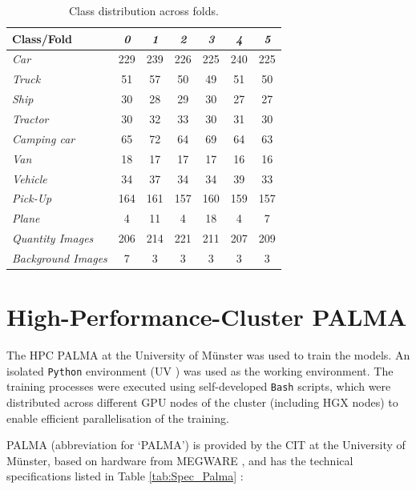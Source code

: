 \begin{table}[h!]
\centering
\begin{tabular}{lcccccc}
\textbf{Class/Fold} & \textit{0} & \textit{1} & \textit{2} & \textit{3} & \textit{4} & \textit{5} \\
\hline
\textit{Car}              & 229 & 239 & 226 & 225 & 240 & 225 \\
\textit{Truck}            & 51  & 57  & 50  & 49  & 51  & 50  \\
\textit{Ship}             & 30  & 28  & 29  & 30  & 27  & 27  \\
\textit{Tractor}          & 30  & 32  & 33  & 30  & 31  & 30  \\
\textit{Camping car}      & 65  & 72  & 64  & 69  & 64  & 63  \\
\textit{Van}              & 18  & 17  & 17  & 17  & 16  & 16  \\
\textit{Vehicle}          & 34  & 37  & 34  & 34  & 39  & 33  \\
\textit{Pick-Up}          & 164 & 161 & 157 & 160 & 159 & 157 \\
\textit{Plane}            & 4   & 11  & 4   & 18  & 4   & 7   \\
\textit{Quantity Images}  & 206 & 214 & 221 & 211 & 207 & 209 \\
\textit{Background Images}& 7   & 3   & 3   & 3   & 3   & 3   \\
\hline
\end{tabular}
\caption{Class distribution across folds.}
\label{tab:fold_distribution}
\end{table}



\section{High-Performance-Cluster PALMA}

The \acrfull{HPC} \Acrshort{PALMA} at the University of Münster was used to train the models. An isolated \texttt{Python} environment (UV \cite{palma_uv}) was used as the working environment. The training processes were executed using self-developed \texttt{Bash} scripts, which were distributed across different \acrshort{GPU} nodes of the cluster (including HGX nodes) to enable efficient parallelisation of the training.

PALMA (abbreviation for ‘\Acrlong{PALMA}’) is provided by the \Acrfull{CIT} at the University of Münster, based on hardware from MEGWARE \cite{palma_spec}, and has the technical specifications listed in Table \ref{tab:Spec_Palma} \cite{palma_spec}:




